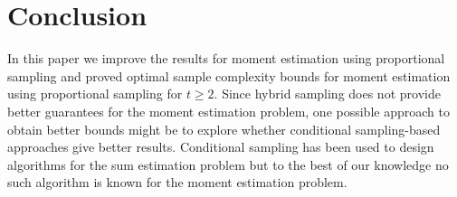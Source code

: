 \section{Conclusion} In this paper we improve the results for moment estimation using proportional sampling and proved optimal sample complexity bounds for moment estimation using proportional sampling for $t\geq 2$. Since hybrid sampling does not provide better guarantees for the moment estimation problem, one possible approach to obtain better bounds might be to explore whether conditional sampling-based approaches give better results. Conditional sampling has been used to design algorithms for the sum estimation problem \cite{ACK2015} but to the best of our knowledge no such algorithm is known for the moment estimation problem.
